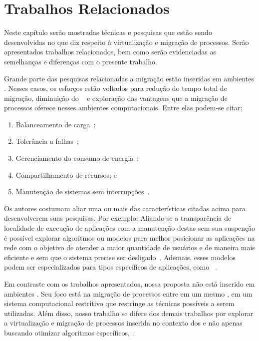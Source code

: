 \chapter{Trabalhos Relacionados}
\label{chap.related-work}

Neste capítulo serão mostradas técnicas e pesquisas que estão sendo desenvolvidas no que diz respeito à virtualização e migração de processos. Serão apresentados trabalhos relacionados, bem como serão evidenciadas as semelhanças e diferenças com o presente trabalho.

Grande parte das pesquisas relacionadas a migração estão inseridas em ambientes \cloud. Nesses casos, os esforços estão voltados para redução do tempo total de migração, diminuição do \downtime~\cite{migration-linux-conteiners,clark2005live} e exploração das vantagens que a migração de processos oferece nesses ambientes computacionais. Entre elas podem-se citar:
\begin{enumerate}[label=(\roman*)]
    \item Balanceamento de carga~\cite{live-vm-migration-techniques,ada-things};
    \item Tolerância a falhas~\cite{fernando2019live};
    \item Gerenciamento do consumo de energia~\cite{aldossary2018performance};
    \item Compartilhamento de recursos; e
    \item Manutenção de sistemas sem interrupções~\cite{live-vm-migration-techniques,ada-things}.
\end{enumerate}


Os autores costumam aliar uma ou mais das características citadas acima para desenvolverem suas pesquisas. Por exemplo:
    Aliando-se a transparência de localidade de execução de aplicações com a manutenção destas sem sua suspenção é possível explorar algorítmos ou modelos para melhor posicionar as aplicações na rede com o objetivo de atender a maior quantidade de usuários e de maneira mais eficiente e sem que o sistema precise ser desligado~\cite{live-migration-sdn}. Ademais, esses modelos podem ser especializados para tipos específicos de aplicações, como \iot~\cite{ada-things}.

Em contraste com os trabalhos apresentados, nossa proposta não está inserido em ambientes \cloud. Seu foco está na migração de processos entre \clusters em um mesmo \chip, em um sistema computacional restritivo que restringe as técnicas possíveis a serem utilizadas. Além disso, nosso trabalho se difere dos demais trabalhos por explorar a virtualização e migração de processos inserida no contexto dos \lws e não apenas buscando otimizar algoritmos específicos, \eg \livemigration.